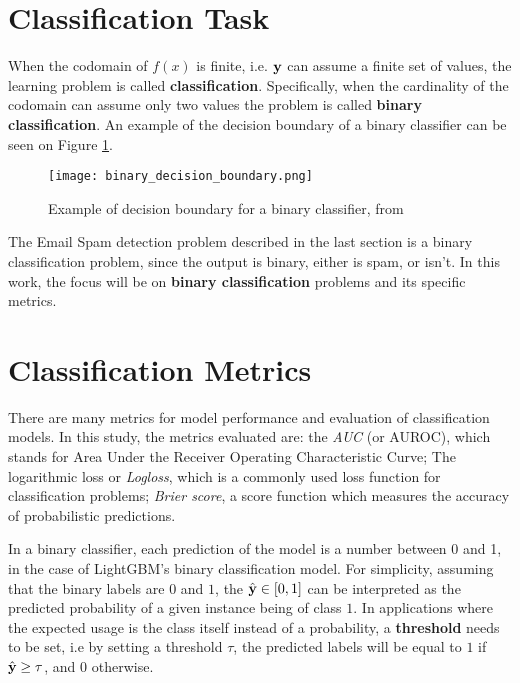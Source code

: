 \section{Classification Task}

When the codomain of $f(x)$ is finite, i.e. $\textbf{\text{\textup{y}}}$ can assume a finite set of values, the learning problem is called \textbf{classification}. Specifically, when the cardinality of the codomain can assume only two values the problem is called \textbf{binary classification}. An example of the decision boundary of a binary classifier can be seen on Figure  \ref{fig:binaryclassifier}.

\begin{figure}[!h]
    \centering
    \texttt{[image: binary\_decision\_boundary.png]} 
    \caption{Example of decision boundary for a binary classifier, from \cite{hastie2009elements}}
    \label{fig:binaryclassifier}
\end{figure}

The Email Spam detection problem described in the last section is a binary classification problem, since the output is binary, either is spam, or isn't. In this work, the focus will be on \textbf{binary classification} problems and its specific metrics.

\section{Classification Metrics}
\label{classification-metrics}

There are many metrics for model performance and evaluation of classification models. In this study, the metrics evaluated are: the \textit{AUC} (or AUROC), which stands for Area Under the Receiver Operating Characteristic Curve; The logarithmic loss or \textit{Logloss}, which is a commonly used loss function for classification problems; \textit{Brier score}, a score function which measures the accuracy of probabilistic predictions.

In a binary classifier, each prediction of the model is a number between 0 and 1, in the case of LightGBM's binary classification model. For simplicity, assuming that the binary labels are $0$ and $1$, the $\hat{\textbf{{\text{\textup{y}}}}}\in [0, 1]$ can be interpreted as the predicted probability of a given instance being of class $1$. In applications where the expected usage is the class itself instead of a probability, a \textbf{threshold} needs to be set, i.e by setting a threshold $\tau$, the predicted labels will be equal to $1$ if $\hat{\textbf{{\text{\textup{y}}}}} \geq \tau$, and $0$ otherwise.

